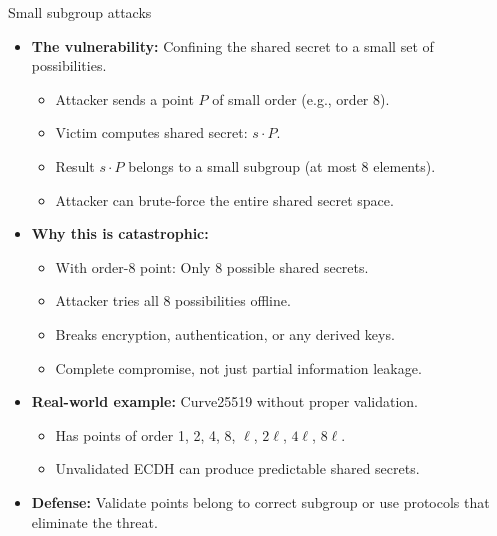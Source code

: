 \documentclass[aspectratio=169, lualatex, handout]{beamer}
\begin{document}
\begin{frame}{Small subgroup attacks}
	\begin{itemize}
		\item \textbf{The vulnerability:} Confining the shared secret to a small set of possibilities.
		      \begin{itemize}
			      \item Attacker sends a point $P$ of small order (e.g., order 8).
			      \item Victim computes shared secret: $s \cdot P$.
			      \item Result $s \cdot P$ belongs to a small subgroup (at most 8 elements).
			      \item Attacker can brute-force the entire shared secret space.
		      \end{itemize}
		\item \textbf{Why this is catastrophic:}
		      \begin{itemize}
			      \item With order-8 point: Only 8 possible shared secrets.
			      \item Attacker tries all 8 possibilities offline.
			      \item Breaks encryption, authentication, or any derived keys.
			      \item Complete compromise, not just partial information leakage.
		      \end{itemize}
		\item \textbf{Real-world example:} Curve25519 without proper validation.
		      \begin{itemize}
			      \item Has points of order 1, 2, 4, 8, $\ell$, $2\ell$, $4\ell$, $8\ell$.
			      \item Unvalidated ECDH can produce predictable shared secrets.
		      \end{itemize}
		\item \textbf{Defense:} Validate points belong to correct subgroup or use protocols that eliminate the threat.
	\end{itemize}
\end{frame}
\end{document}
